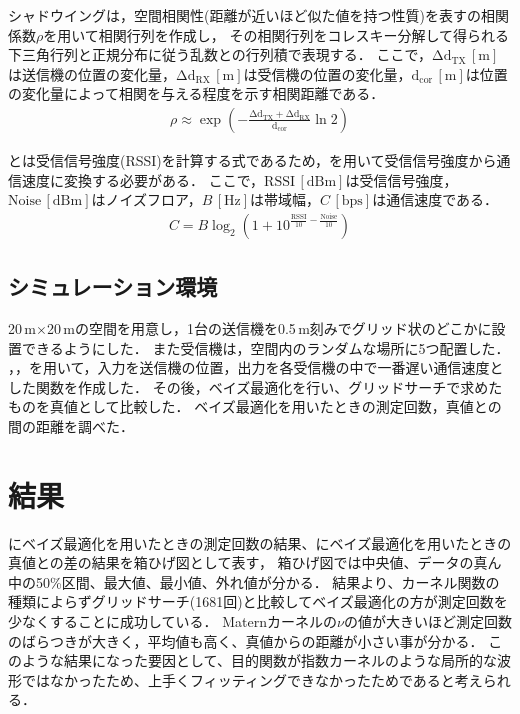 \documentclass[twocolumn]{ltjarticle}
\begin{document}
シャドウイングは，空間相関性(距離が近いほど似た値を持つ性質)を表すの相関係数\(\rho\)を用いて相関行列を作成し，
その相関行列をコレスキー分解して得られる下三角行列と正規分布に従う乱数との行列積で表現する\cite{shadowing}．
ここで，\(\mathrm{\Delta d_{TX}}\,\mathrm{[m]}\)は送信機の位置の変化量，\(\mathrm{\Delta d_{RX}}\,\mathrm{[m]}\)は受信機の位置の変化量，\(\mathrm{d_{cor}}\,\mathrm{[m]}\)は位置の変化量によって相関を与える程度を示す相関距離である．
\begin{align}
	\rho \approx \exp \left( - \mathrm{\frac{\Delta d_{TX} + \Delta d_{RX}}{d_{cor}}} \ln 2 \right) \label{eq:shadowing}
\end{align}

とは受信信号強度(RSSI)を計算する式であるため，を用いて受信信号強度から通信速度に変換する必要がある．
ここで，\(\mathrm{RSSI}\,[\mathrm{dBm}]\)は受信信号強度，\(\mathrm{Noise}\,[\mathrm{dBm}]\)はノイズフロア，\(B\,[\mathrm{Hz}]\)は帯域幅，\(C\,[\mathrm{bps}]\)は通信速度である．
\begin{align}
	C = B \log_2 \left( 1 + 10^{\frac{\mathrm{RSSI}}{10}-\frac{\mathrm{Noise}}{10}} \right) \label{eq:capacity}
\end{align}
\subsection{シミュレーション環境}

20\(\,\)m\(\times\)20\(\,\)mの空間を用意し，1台の送信機を0.5\(\,\mathrm{m}\)刻みでグリッド状のどこかに設置できるようにした．
また受信機は，空間内のランダムな場所に5つ配置した．
，，を用いて，入力を送信機の位置，出力を各受信機の中で一番遅い通信速度とした関数を作成した．
その後，ベイズ最適化を行い、グリッドサーチで求めたものを真値として比較した．
ベイズ最適化を用いたときの測定回数，真値との間の距離を調べた．
\section{結果}

にベイズ最適化を用いたときの測定回数の結果、にベイズ最適化を用いたときの真値との差の結果を箱ひげ図として表す，
箱ひげ図では中央値、データの真ん中の50\%区間、最大値、最小値、外れ値が分かる．
結果より、カーネル関数の種類によらずグリッドサーチ(1681回)と比較してベイズ最適化の方が測定回数を少なくすることに成功している．
Maternカーネルの\(\nu\)の値が大きいほど測定回数のばらつきが大きく，平均値も高く、真値からの距離が小さい事が分かる．
このような結果になった要因として、目的関数が指数カーネルのような局所的な波形ではなかったため、上手くフィッティングできなかったためであると考えられる．
\end{document}
